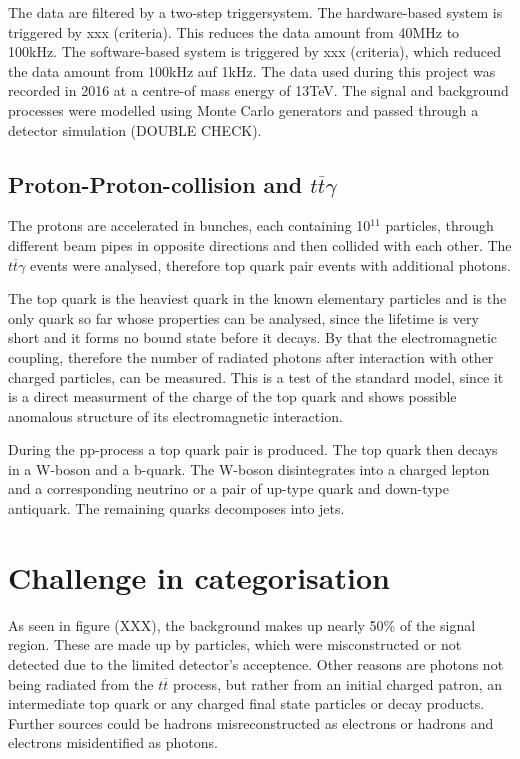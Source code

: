 \documentclass[11pt]{scrartcl}
\begin{document}
	The data are filtered by a two-step triggersystem. The hardware-based system is triggered by xxx (criteria). This reduces the data amount from 40MHz to 100kHz. The software-based system is triggered by xxx (criteria), which reduced the data amount from 100kHz auf 1kHz.  The data used during this project was recorded in 2016 at a centre-of mass energy of 13TeV. The signal and background processes were modelled using Monte Carlo generators and passed through a detector simulation (DOUBLE CHECK). 

	\subsection{Proton-Proton-collision and $t\overline{t}\gamma$}
	The protons are accelerated in bunches, each containing 10$^{11}$ particles, through different beam pipes in opposite directions and then collided with each other. The $t\overline{t}\gamma$ events were analysed, therefore top quark pair events with additional photons.
	
	The top quark is the heaviest quark in the known elementary particles and is the only quark so far whose properties can be analysed, since the lifetime is very short and it forms no bound state before it decays. By that the electromagnetic coupling, therefore the number of radiated photons after interaction with other charged particles, can be measured. This is a test of the standard model, since it is a direct measurment of the charge of the top quark and shows possible anomalous structure of its electromagnetic interaction.
	
	During the pp-process a top quark pair is produced. The top quark then decays in a W-boson and a b-quark. The W-boson disintegrates into a charged lepton and a corresponding neutrino or a pair of up-type quark and down-type antiquark. The remaining quarks decomposes into jets.

\section{Challenge in categorisation}

As seen in figure (XXX), the background makes up nearly 50\% of the signal region. These are made up by particles, which were misconstructed or not detected due to the limited detector's acceptence. Other reasons are photons not being radiated from the $t\overline{t}$ process, but rather from an initial charged patron, an intermediate top quark or any charged final state particles or decay products. Further sources could be hadrons misreconstructed as electrons or hadrons and electrons misidentified as photons. 
\end{document}
